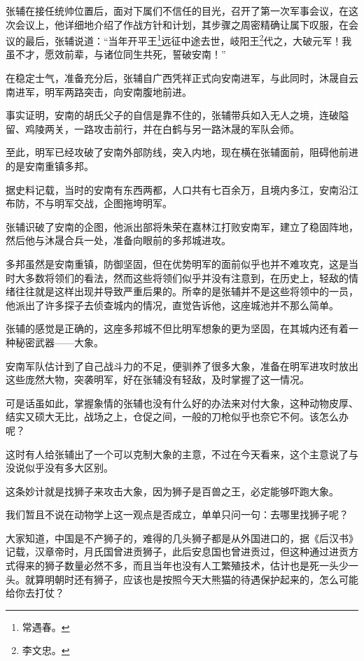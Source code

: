 \begin{multicols}{\theparacolNo}
张辅在接任统帅位置后，面对下属们不信任的目光，召开了第一次军事会议，在这次会议上，他详细地介绍了作战方针和计划，其步骤之周密精确让属下叹服，在会议的最后，张辅说道：“当年开平王\footnote{常遇春。}远征中途去世，岐阳王\footnote{李文忠。}代之，大破元军！我虽不才，愿效前辈，与诸位同生共死，誓破安南！”

在稳定士气，准备充分后，张辅自广西凭祥正式向安南进军，与此同时，沐晟自云南进军，明军两路突击，向安南腹地前进。

事实证明，安南的胡氏父子的自信是靠不住的，张辅带兵如入无人之境，连破隘留、鸡陵两关，一路攻击前行，并在白鹤与另一路沐晟的军队会师。

至此，明军已经攻破了安南外部防线，突入内地，现在横在张辅面前，阻碍他前进的是安南重镇多邦。

据史料记载，当时的安南有东西两都，人口共有七百余万，且境内多江，安南沿江布防，不与明军交战，企图拖垮明军。

张辅识破了安南的企图，他派出部将朱荣在嘉林江打败安南军，建立了稳固阵地，然后他与沐晟合兵一处，准备向眼前的多邦城进攻。

多邦虽然是安南重镇，防御坚固，但在优势明军的面前似乎也并不难攻克，这是当时大多数将领们的看法，然而这些将领们似乎并没有注意到，在历史上，轻敌的情绪往往就是这样出现并导致严重后果的。所幸的是张辅并不是这些将领中的一员，他派出了许多探子去侦查城内的情况，直觉告诉他，这座城池并不那么简单。

张辅的感觉是正确的，这座多邦城不但比明军想象的更为坚固，在其城内还有着一种秘密武器——大象。

安南军队估计到了自己战斗力的不足，便驯养了很多大象，准备在明军进攻时放出这些庞然大物，突袭明军，好在张辅没有轻敌，及时掌握了这一情况。

可是话虽如此，掌握象情的张辅也没有什么好的办法来对付大象，这种动物皮厚、结实又硕大无比，战场之上，仓促之间，一般的刀枪似乎也奈它不何。该怎么办呢？

这时有人给张辅出了一个可以克制大象的主意，不过在今天看来，这个主意说了与没说似乎没有多大区别。

这条妙计就是找狮子来攻击大象，因为狮子是百兽之王，必定能够吓跑大象。

我们暂且不说在动物学上这一观点是否成立，单单只问一句：去哪里找狮子呢？

大家知道，中国是不产狮子的，难得的几头狮子都是从外国进口的，据《后汉书》记载，汉章帝时，月氏国曾进贡狮子，此后安息国也曾进贡过，但这种通过进贡方式得来的狮子数量必然不多，而且当年也没有人工繁殖技术，估计也是死一头少一头。就算明朝时还有狮子，应该也是按照今天大熊猫的待遇保护起来的，怎么可能给你去打仗？


\end{multicols}
